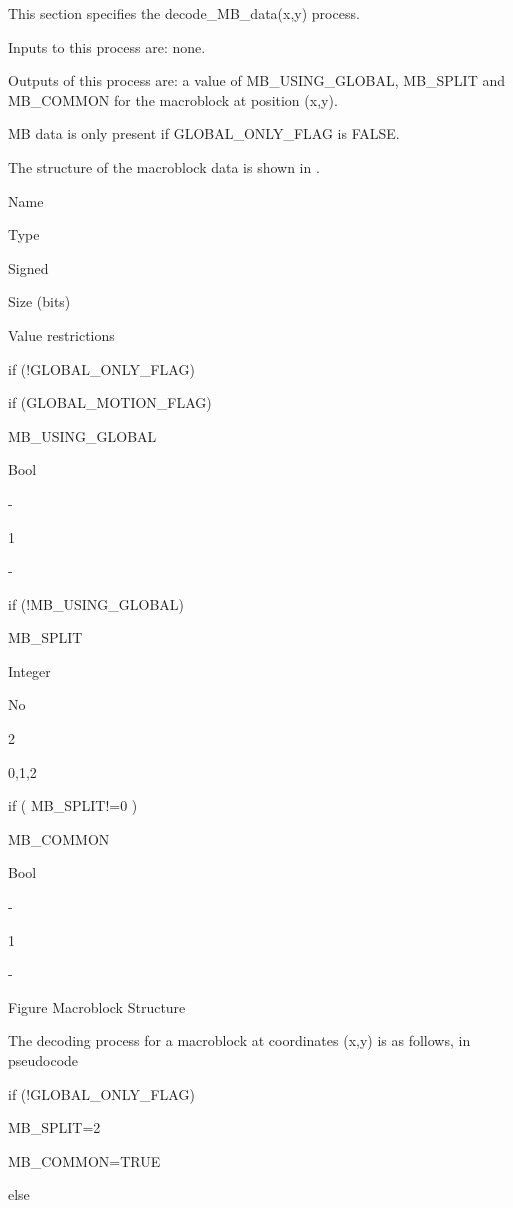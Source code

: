 This section specifies the decode\_MB\_data(x,y) process.

Inputs to this process are: none. 

Outputs of this process are: a value of MB\_USING\_GLOBAL, MB\_SPLIT and
MB\_COMMON for the macroblock at position (x,y).

MB data is only present if GLOBAL\_ONLY\_FLAG is FALSE.

The structure of the macroblock data is shown in .


Name

Type

Signed

Size (bits)

Value restrictions

if (!GLOBAL\_ONLY\_FLAG)

{

    if (GLOBAL\_MOTION\_FLAG)

    {

        MB\_USING\_GLOBAL

Bool

-

1

-

    }

    if (!MB\_USING\_GLOBAL)

    {

        MB\_SPLIT

Integer

No

2

0,1,2
    }

    if ( MB\_SPLIT!=0 )
    {
        MB\_COMMON

Bool

-

1

-

    }

}


Figure      Macroblock Structure

The decoding process for a macroblock at coordinates (x,y) is as
follows, in pseudocode

if (!GLOBAL\_ONLY\_FLAG)

{

    MB\_SPLIT=2

    MB\_COMMON=TRUE

}

else


